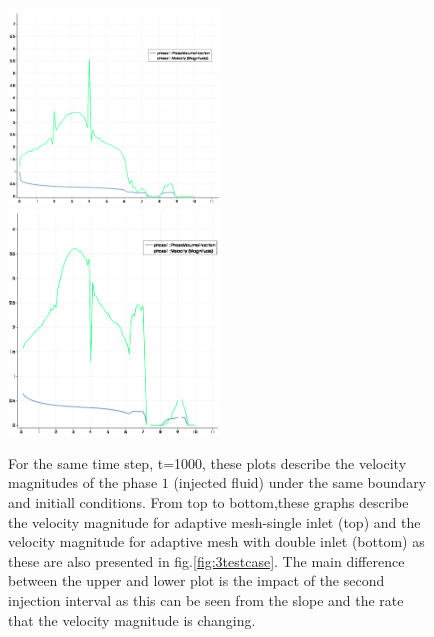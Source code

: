 \documentclass[preprint,authoryear,12pt]{elsarticle}
\begin{document}
{\begin{figure}
\centering 
\includegraphics[width=0.5\textwidth]{./Pics1/mr10_5regions_adapt/5regions_adapt_vel_magn.pdf}\\[2mm]%
\includegraphics[width=0.5\textwidth]{./Pics1/mr10_5regions_adapt_dinlet/5regions_dinlet_adapt_vel_magn.pdf}%
\caption{For the same time step, t=1000, these plots describe the velocity magnitudes of the phase $1$ (injected fluid) under the same boundary and initiall conditions. From top to bottom,these graphs describe the velocity magnitude %
for adaptive mesh-single inlet (top) and the velocity magnitude for adaptive mesh with double inlet (bottom) as these are also presented in fig.\ref{fig:3testcase}. The main difference between the upper and lower plot %
is the impact of the second injection interval as this can be seen from the slope and the rate that the velocity magnitude is changing.}
\label{fig:vel_magn2}
\end{figure}



}
\end{document}
